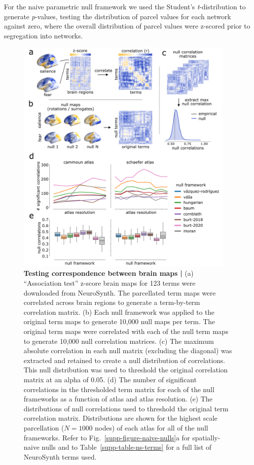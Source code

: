 \documentclass[12pt,aps,pra,reprint,showkeys]{revtex4-1}
\begin{document}
For the naive parametric null framework we used the Student's \emph{t}-distribution to generate \emph{p}-values, testing the distribution of parcel values for each network against zero, where the overall distribution of parcel values were z-scored prior to segregation into networks.

\begin{figure}[htp]
  \begin{center}
    \centerline{\includegraphics[width=0.95\textwidth]{neurosynth-results.png}}
    \caption{
      \textbf{Testing correspondence between brain maps |}
      (a) ``Association test'' z-score brain maps for 123 terms were downloaded from NeuroSynth.
      The parcellated term maps were correlated across brain regions to generate a term-by-term correlation matrix.
      (b) Each null framework was applied to the original term maps to generate 10,000 null maps per term.
      The original term maps were correlated with each of the null term maps to generate 10,000 null correlation matrices.
      (c) The maximum absolute correlation in each null matrix (excluding the diagonal) was extracted and retained to create a null distribution of correlations.
      This null distribution was used to threshold the original correlation matrix at an alpha of 0.05.
      (d) The number of significant correlations in the thresholded term matrix for each of the null frameworks as a function of atlas and atlas resolution.
      (e) The distributions of null correlations used to threshold the original term correlation matrix.
      Distributions are shown for the highest scale parcellation ($N = 1000$ nodes) of each atlas for all of the null frameworks.
      Refer to Fig.~\ref{supp-figure-naive-nulls}a for spatially-naive nulls and to Table~\ref{supp-table-ns-terms} for a full list of NeuroSynth terms used.
      }
    \label{figure-neurosynth-results}
  \end{center}
\end{figure}
\end{document}
